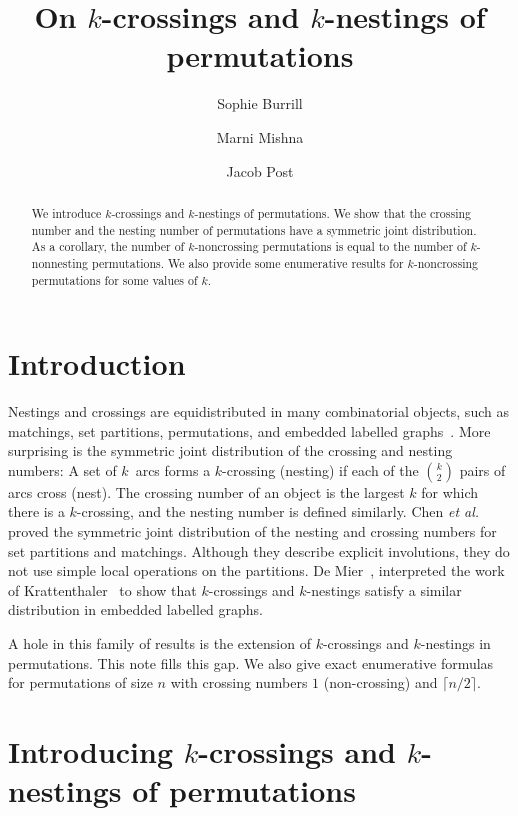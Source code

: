 \documentclass{amsart}
\title{On $k$-crossings and $k$-nestings of permutations}
\author{Sophie Burrill     \and Marni Mishna     \and {Jacob Post}}
\begin{document}
\begin{abstract}
We introduce $k$-crossings and $k$-nestings of permutations. We show that the crossing number and the nesting number of permutations have a symmetric joint distribution.  As a corollary, the number of $k$-noncrossing permutations is equal to the number of $k$-nonnesting permutations. We also provide some enumerative results for $k$-noncrossing permutations for some values of $k$. 
\end{abstract}
\maketitle

\section{Introduction}
Nestings and crossings are equidistributed in many combinatorial objects, such as matchings, set partitions, permutations, and embedded labelled graphs~\cite{Chetal07, Corteel07, deMi07}. More surprising is the symmetric joint distribution of the crossing and nesting numbers:  A set of $k$~arcs forms a $k$-crossing (nesting) if each of the $\binom{k}{2}$ pairs of  arcs cross (nest).  The crossing number of an object is the largest $k$ for which there is a $k$-crossing, and the nesting number is defined similarly.  Chen \emph{ et al.}~ \cite{Chetal07} proved the symmetric joint distribution of the nesting and crossing  numbers for set partitions and matchings. Although they describe explicit involutions, they do not use simple local operations on the partitions. De Mier~\cite{deMi07}, interpreted the work of Krattenthaler~\cite{Kratt06} to show that $k$-crossings and $k$-nestings satisfy a similar distribution in embedded labelled graphs. 

A hole in this family of results is the extension of $k$-crossings and $k$-nestings in permutations. This note fills this gap. We also give exact enumerative formulas for permutations of size $n$ with crossing numbers $1$ (non-crossing) and $\lceil n/2\rceil$.

\section{Introducing $k$-crossings and $k$-nestings of permutations}
\end{document}
